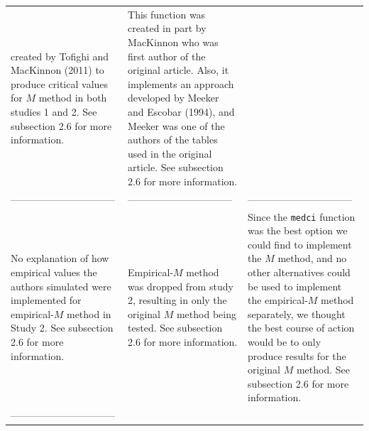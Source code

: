 \documentclass[10,a4paperpaper,]{article}
\begin{document}
\begin{longtable}[]{@{}lll@{}}
\begin{minipage}[t]{0.30\columnwidth}
created by Tofighi and MacKinnon (2011) to produce critical values for
\(M\) method in both studies 1 and 2. See subsection 2.6 for more
information.\strut
\end{minipage} & \begin{minipage}[t]{0.30\columnwidth}\raggedright\strut
This function was created in part by MacKinnon who was first author of
the original article. Also, it implements an approach developed by
Meeker and Escobar (1994), and Meeker was one of the authors of the
tables used in the original article. See subsection 2.6 for more
information.\strut
\end{minipage}\tabularnewline
\begin{minipage}[t]{0.30\columnwidth}\raggedright\strut
--------------------------------\strut
\end{minipage} & \begin{minipage}[t]{0.30\columnwidth}\raggedright\strut
--------------------------------\strut
\end{minipage} & \begin{minipage}[t]{0.30\columnwidth}\raggedright\strut
--------------------------------\strut
\end{minipage}\tabularnewline
\begin{minipage}[t]{0.30\columnwidth}\raggedright\strut
No explanation of how empirical values the authors simulated were
implemented for empirical-\(M\) method in Study 2. See subsection 2.6
for more information.\strut
\end{minipage} & \begin{minipage}[t]{0.30\columnwidth}\raggedright\strut
Empirical-\(M\) method was dropped from study 2, resulting in only the
original \(M\) method being tested. See subsection 2.6 for more
information.\strut
\end{minipage} & \begin{minipage}[t]{0.30\columnwidth}\raggedright\strut
Since the \texttt{medci} function was the best option we could find to
implement the \(M\) method, and no other alternatives could be used to
implement the empirical-\(M\) method separately, we thought the best
course of action would be to only produce results for the original \(M\)
method. See subsection 2.6 for more information.\strut
\end{minipage}\tabularnewline
\begin{minipage}[t]{0.30\columnwidth}\raggedright\strut
--------------------------------\strut
\end{minipage} & \begin{minipage}[t]{0.30\columnwidth}\raggedright\strut

\end{minipage}
\end{longtable}
\end{document}
